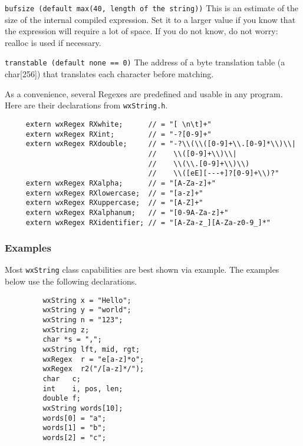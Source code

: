 {\tt bufsize (default max(40, length of the string))} 
This is an estimate of the size of the internal compiled
expression. Set it to a larger value if you know that the
expression will require a lot of space. If you do not know, do not
worry: realloc is used if necessary.

{\tt transtable (default none == 0)} 
The address of a byte translation table (a char[256]) that
translates each character before matching.

As a convenience, several Regexes are predefined and usable in any
program. Here are their declarations from {\tt wxString.h}.
\begin{verbatim}
     extern wxRegex RXwhite;      // = "[ \n\t]+"
     extern wxRegex RXint;        // = "-?[0-9]+"
     extern wxRegex RXdouble;     // = "-?\\(\\([0-9]+\\.[0-9]*\\)\\|
                                  //    \\([0-9]+\\)\\|
                                  //    \\(\\.[0-9]+\\)\\)
                                  //    \\([eE][---+]?[0-9]+\\)?"
     extern wxRegex RXalpha;      // = "[A-Za-z]+"
     extern wxRegex RXlowercase;  // = "[a-z]+"
     extern wxRegex RXuppercase;  // = "[A-Z]+"
     extern wxRegex RXalphanum;   // = "[0-9A-Za-z]+"
     extern wxRegex RXidentifier; // = "[A-Za-z_][A-Za-z0-9_]*"
\end{verbatim}

\subsubsection{Examples}

Most {\tt wxString} class capabilities are best shown via example.  The
examples below use the following declarations.

\begin{verbatim}
         wxString x = "Hello";
         wxString y = "world";
         wxString n = "123";
         wxString z;
         char *s = ",";
         wxString lft, mid, rgt;
         wxRegex  r = "e[a-z]*o";
         wxRegex  r2("/[a-z]*/");
         char   c;
         int    i, pos, len;
         double f;
         wxString words[10];
         words[0] = "a";
         words[1] = "b";
         words[2] = "c";
\end{verbatim}

